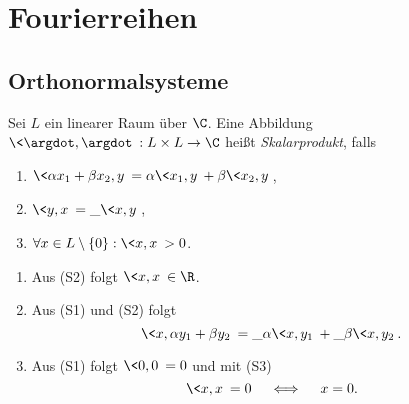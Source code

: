 
\chapter{Fourierreihen}

\section{Orthonormalsysteme}


\begin{df} \label{1.1}
	Sei $L$ ein linearer Raum über $\C$.
	Eine Abbildung $\<\argdot, \argdot\>: L \times L \to \C$ heißt \emph{Skalarprodukt}, falls
	\begin{enumerate}[(S1)]
		\item
			$\<\alpha x_1 + \beta x_2, y \> = \alpha \<x_1,y\> + \beta \<x_2, y\>$,
		\item
			$\<y,x\> = \_{\<x,y\>}$,
		\item
			$\forall x\in L\setminus \{0\} : \<x,x\> > 0$.
	\end{enumerate}
\end{df}

\begin{nt} \label{1.2}
	\begin{enumerate}[1)]
		\item
			Aus (S2) folgt $\<x,x\> \in \R$.
		\item
			Aus (S1) und (S2) folgt
			\[
				\<x, \alpha y_1 + \beta y_2\> = \_\alpha \<x,y_1\> + \_\beta \<x,y_2\>.
			\]
		\item
			Aus (S1) folgt $\<0,0\> = 0$ und mit (S3)
			\[
				\<x,x\> = 0 \quad\iff\quad x=0.
			\]
	\end{enumerate}
\end{nt}

